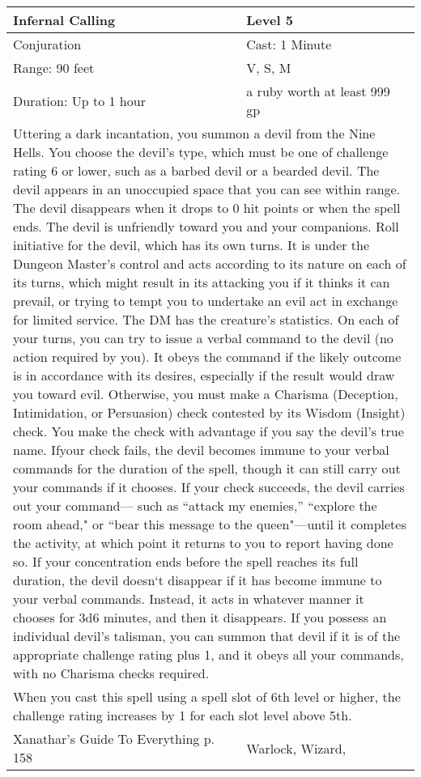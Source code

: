 \documentclass[11pt]{report}
\begin{document}
\begin{table}[H]
	\begin{tabular}{||p{6cm}|p{6cm}||}
		\hline\hline
		\bf{Infernal Calling} & Level 5\\ \hline
		Conjuration & Cast: 1 Minute\\ \hline
		Range: 90 feet & V, S, M\\ \hline
		Duration: Up to 1 hour & a ruby worth at least 999 gp\\ \hline
		\multicolumn{2}{||p{12cm}||}{Uttering a dark incantation, you summon a devil from the Nine Hells. You choose the devil’s type, which must be one of challenge rating 6 or lower, such as a barbed devil or a bearded devil. The devil appears in an unoccupied space that you can see within range. The devil disappears when it drops to 0 hit points or when the spell ends.
The devil is unfriendly toward you and your companions. Roll initiative for the devil, which has its own turns. It is under the Dungeon Master’s control and acts according to its nature on each of its turns, which might result in its attacking you if it thinks it can prevail, or trying to tempt you to undertake an evil act in exchange for limited service. The DM has the creature’s statistics.
On each of your turns, you can try to issue a verbal command to the devil (no action required by you). It obeys the command if the likely outcome is in accordance with its desires, especially if the result would draw you toward evil. Otherwise, you must make a Charisma (Deception, Intimidation, or Persuasion) check contested by its Wisdom (Insight) check. You make the check with advantage if you say the devil’s true name. Ifyour check fails, the devil becomes immune to your verbal commands for the duration of the spell, though it can still carry out your commands if it chooses. If your check succeeds, the devil carries out your command— such as “attack my enemies,” “explore the room ahead," or “bear this message to the queen"—until it completes the activity, at which point it returns to you to report having done so.
If your concentration ends before the spell reaches its full duration, the devil doesn‘t disappear if it has become immune to your verbal commands. Instead, it acts in whatever manner it chooses for 3d6 minutes, and then it disappears.
If you possess an individual devil’s talisman, you can summon that devil if it is of the appropriate challenge
rating plus 1, and it obeys all your commands, with no Charisma checks required.}\\ \hline
		\multicolumn{2}{||p{12cm}||}{When you cast this spell using a spell slot of 6th level or higher, the challenge rating increases by 1 for each slot level above 5th.}\\ \hline
Xanathar's Guide To Everything p. 158 & Warlock, Wizard, \\ \hline\hline
	\end{tabular}
\end{table}
\end{document}
